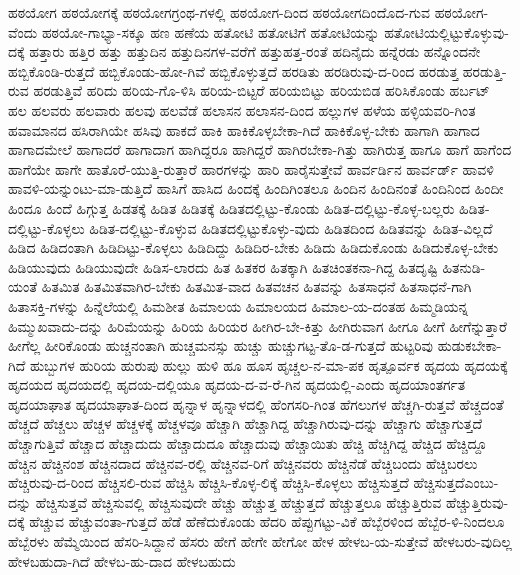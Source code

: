 {ಹಠಯೋಗ
ಹಠಯೋಗಕ್ಕೆ
ಹಠಯೋಗಗ್ರಂಥ-ಗಳಲ್ಲಿ
ಹಠಯೋಗ-ದಿಂದ
ಹಠಯೋಗದಿಂದೊದ-ಗುವ
ಹಠಯೋಗ-ವೆಂದು
ಹಠಯೋ-ಗಾಭ್ಯಾ-ಸಕ್ಕೂ
ಹಣ
ಹಣೆಯ
ಹತೋಟಿ
ಹತೋಟಿಗೆ
ಹತೋಟಿಯನ್ನು
ಹತೋಟಿಯಲ್ಲಿಟ್ಟುಕೊಳ್ಳುವು-ದಕ್ಕೆ
ಹತ್ತಾರು
ಹತ್ತಿರ
ಹತ್ತು
ಹತ್ತುದಿನ
ಹತ್ತುದಿನಗಳ-ವರೆಗೆ
ಹತ್ತುಹತ್ತ-ರಂತೆ
ಹದಿನೈದು
ಹನ್ನೆರಡು
ಹನ್ನೊಂದನೇ
ಹಬ್ಬಿಕೊಂಡಿ-ರುತ್ತದೆ
ಹಬ್ಬಿಕೊಂಡು-ಹೋ-ಗಿವೆ
ಹಬ್ಬಿಕೊಳ್ಳುತ್ತದೆ
ಹರಡಿತು
ಹರಡಿರುವು-ದ-ರಿಂದ
ಹರಡುತ್ತ
ಹರಡುತ್ತಿ-ರುವ
ಹರಡುತ್ತಿವೆ
ಹರಿದು
ಹರಿಯ-ಗೊ-ಳಿಸಿ
ಹರಿಯ-ಬಿಟ್ಟರೆ
ಹರಿಯಬಿಟ್ಟು
ಹರಿಯಬಿಡ
ಹರಿಸಿಕೊಂಡು
ಹರ್ಬಟ್
ಹಲ
ಹಲವರು
ಹಲವಾರು
ಹಲವು
ಹಲವೆಡೆ
ಹಲಾಸನ
ಹಲಾಸನ-ದಿಂದ
ಹಲ್ಲುಗಳ
ಹಳೆಯ
ಹಳ್ಳಿಯವರಿ-ಗಿಂತ
ಹವಾಮಾನದ
ಹಸಿರಾಗಿಯೇ
ಹಸಿವು
ಹಾಕದೆ
ಹಾಕಿ
ಹಾಕಿಕೊಳ್ಳಬೇಕಾ-ಗಿದೆ
ಹಾಕಿಕೊಳ್ಳ-ಬೇಕು
ಹಾಗಾಗಿ
ಹಾಗಾದ
ಹಾಗಾದಮೇಲೆ
ಹಾಗಾದರೆ
ಹಾಗಾದಾಗ
ಹಾಗಿದ್ದರೂ
ಹಾಗಿದ್ದರೆ
ಹಾಗಿರಬೇಕಾ-ಗಿತ್ತು
ಹಾಗಿರುತ್ತ
ಹಾಗೂ
ಹಾಗೆ
ಹಾಗೆಂದ
ಹಾಗೆಯೇ
ಹಾಗೇ
ಹಾತೊರೆ-ಯುತ್ತಿ-ರುತ್ತಾರೆ
ಹಾರಗಳನ್ನು
ಹಾರಿ
ಹಾರೈಸುತ್ತೇವೆ
ಹಾರ್ವರ್ಡಿನ
ಹಾರ್ವರ್ಡ್
ಹಾವಳಿ
ಹಾವಳಿ-ಯನ್ನುಂಟು-ಮಾ-ಡುತ್ತಿದೆ
ಹಾಸಿಗೆ
ಹಾಸಿದ
ಹಿಂದಕ್ಕೆ
ಹಿಂದಿಗಿಂತಲೂ
ಹಿಂದಿನ
ಹಿಂದಿನಂತೆ
ಹಿಂದಿನಿಂದ
ಹಿಂದೀ
ಹಿಂದೂ
ಹಿಂದೆ
ಹಿಗ್ಗುತ್ತ
ಹಿಡತಕ್ಕೆ
ಹಿಡಿತ
ಹಿಡಿತಕ್ಕೆ
ಹಿಡಿತದಲ್ಲಿಟ್ಟು-ಕೊಂಡು
ಹಿಡಿತ-ದಲ್ಲಿಟ್ಟು-ಕೊಳ್ಳ-ಬಲ್ಲರು
ಹಿಡಿತ-ದಲ್ಲಿಟ್ಟು-ಕೊಳ್ಳಲು
ಹಿಡಿತ-ದಲ್ಲಿಟ್ಟು-ಕೊಳ್ಳುವ
ಹಿಡಿತದಲ್ಲಿಟ್ಟುಕೊಳ್ಳು-ವುದು
ಹಿಡಿತದಿಂದ
ಹಿಡಿತವನ್ನು
ಹಿಡಿತ-ವಿಲ್ಲದೆ
ಹಿಡಿದ
ಹಿಡಿದಂತಾಗಿ
ಹಿಡಿದಿಟ್ಟು-ಕೊಳ್ಳಲು
ಹಿಡಿದಿದ್ದು
ಹಿಡಿದಿರ-ಬೇಕು
ಹಿಡಿದು
ಹಿಡಿದುಕೊಂಡು
ಹಿಡಿದುಕೊಳ್ಳ-ಬೇಕು
ಹಿಡಿಯುವುದು
ಹಿಡಿಯುವುದೇ
ಹಿಡಿಸ-ಲಾರದು
ಹಿತ
ಹಿತಕರ
ಹಿತಕ್ಕಾಗಿ
ಹಿತಚಿಂತಕನಾ-ಗಿದ್ದ
ಹಿತದೃಷ್ಟಿ
ಹಿತನುಡಿ-ಯಂತೆ
ಹಿತಮಿತ
ಹಿತಮಿತವಾಗಿರ-ಬೇಕು
ಹಿತಮಿತ-ವಾದ
ಹಿತವಚನ
ಹಿತವನ್ನು
ಹಿತಸಾಧನೆ
ಹಿತಸಾಧನೆ-ಗಾಗಿ
ಹಿತಾಸಕ್ತಿ-ಗಳನ್ನು
ಹಿನ್ನೆಲೆಯಲ್ಲಿ
ಹಿಮಶೀತ
ಹಿಮಾಲಯ
ಹಿಮಾಲಯದ
ಹಿಮಾಲ-ಯ-ದಂತಹ
ಹಿಮ್ಮಡಿಯನ್ನ
ಹಿಮ್ಮುಖವಾದು-ದನ್ನು
ಹಿರಿಮೆಯನ್ನು
ಹಿರಿಯ
ಹಿರಿಯರ
ಹೀಗಿರ-ಬೇ-ಕಿತ್ತು
ಹೀಗಿರುವಾಗ
ಹೀಗೂ
ಹೀಗೆ
ಹೀಗೆನ್ನುತ್ತಾರೆ
ಹೀಗೆಲ್ಲ
ಹೀರಿಕೊಂಡು
ಹುಚ್ಚನಂತಾಗಿ
ಹುಚ್ಚಮನಸ್ಸು
ಹುಚ್ಚು
ಹುಚ್ಚುಗಟ್ಟ-ತೊ-ಡ-ಗುತ್ತದೆ
ಹುಟ್ಟರಿವು
ಹುಡುಕಬೇಕಾ-ಗಿದೆ
ಹುಬ್ಬುಗಳ
ಹುರಿಯ
ಹುರುಪು
ಹುಲ್ಲು
ಹುಳಿ
ಹೂ
ಹೂಸ
ಹೃಚ್ಚಲ-ನ-ಮಾ-ಪಕ
ಹೃತ್ಪೂರ್ವಕ
ಹೃದಯ
ಹೃದಯಕ್ಕೆ
ಹೃದಯದ
ಹೃದಯದಲ್ಲಿ
ಹೃದಯ-ದಲ್ಲಿಯೂ
ಹೃದಯ-ದ-ವ-ರೆ-ಗಿನ
ಹೃದಯಲ್ಲಿ-ಎಂದು
ಹೃದಯಾಂತರ್ಗತ
ಹೃದಯಾಘಾತ
ಹೃದಯಾಘಾತ-ದಿಂದ
ಹೃನ್ನಾಳ
ಹೃನ್ನಾಳದಲ್ಲಿ
ಹೆಂಗಸರಿ-ಗಿಂತ
ಹೆಗಲುಗಳ
ಹೆಚ್ಚಗಿ-ರುತ್ತವೆ
ಹೆಚ್ಚದಂತೆ
ಹೆಚ್ಚದೆ
ಹೆಚ್ಚಲು
ಹೆಚ್ಚಳ
ಹೆಚ್ಚಳಕ್ಕೆ
ಹೆಚ್ಚಳವೂ
ಹೆಚ್ಚಾಗಿ
ಹೆಚ್ಚಾಗಿದ್ದ
ಹೆಚ್ಚಾಗಿರುವು-ದನ್ನು
ಹೆಚ್ಚಾಗು
ಹೆಚ್ಚಾಗುತ್ತದೆ
ಹೆಚ್ಚಾಗುತ್ತಿವೆ
ಹೆಚ್ಚಾದ
ಹೆಚ್ಚಾದುದು
ಹೆಚ್ಚಾದುದೂ
ಹೆಚ್ಚಾದುವು
ಹೆಚ್ಚಾಯಿತು
ಹೆಚ್ಚಿ
ಹೆಚ್ಚಿಗಿದ್ದ
ಹೆಚ್ಚಿದ
ಹೆಚ್ಚಿದ್ದೂ
ಹೆಚ್ಚಿನ
ಹೆಚ್ಚಿನಂಶ
ಹೆಚ್ಚಿನದಾದ
ಹೆಚ್ಚಿನವ-ರಲ್ಲಿ
ಹೆಚ್ಚಿನವ-ರಿಗೆ
ಹೆಚ್ಚಿನವರು
ಹೆಚ್ಚಿನೆಡೆ
ಹೆಚ್ಚಿಬಂದು
ಹೆಚ್ಚಿಬರಲು
ಹೆಚ್ಚಿರುವು-ದ-ರಿಂದ
ಹೆಚ್ಚಿಸಲಿ-ರುವ
ಹೆಚ್ಚಿಸಿ
ಹೆಚ್ಚಿಸಿ-ಕೊಳ್ಳ-ಲಿಕ್ಕೆ
ಹೆಚ್ಚಿಸಿ-ಕೊಳ್ಳಲು
ಹೆಚ್ಚಿಸುತ್ತದೆ
ಹೆಚ್ಚಿಸುತ್ತದೆಎಂಬು-ದನ್ನು
ಹೆಚ್ಚಿಸುತ್ತವೆ
ಹೆಚ್ಚಿಸುವಲ್ಲಿ
ಹೆಚ್ಚಿಸುವುದೇ
ಹೆಚ್ಚು
ಹೆಚ್ಚುತ್ತ
ಹೆಚ್ಚುತ್ತದೆ
ಹೆಚ್ಚುತ್ತಲೂ
ಹೆಚ್ಚುತ್ತಿರುವ
ಹೆಚ್ಚುತ್ತಿರುವು-ದಕ್ಕೆ
ಹೆಚ್ಚುವ
ಹೆಚ್ಚುವಂತಾ-ಗುತ್ತದೆ
ಹೆಡೆ
ಹೆಣೆದುಕೊಂಡು
ಹೆದರಿ
ಹೆಪ್ಪುಗಟ್ಟು-ವಿಕೆ
ಹೆಬ್ಬೆರಳಿಂದ
ಹೆಬ್ಬೆರ-ಳಿ-ನಿಂದಲೂ
ಹೆಬ್ಬೆರಳು
ಹೆಮ್ಮೆಯಿಂದ
ಹೆಸರಿ-ಸಿದ್ದಾನೆ
ಹೆಸರು
ಹೇಗೆ
ಹೇಗೇ
ಹೇಗೋ
ಹೇಳ
ಹೇಳಬ-ಯ-ಸುತ್ತೇವೆ
ಹೇಳಬರು-ವುದಿಲ್ಲ
ಹೇಳಬಹುದಾ-ಗಿದೆ
ಹೇಳಬ-ಹು-ದಾದ
ಹೇಳಬಹುದು
}
